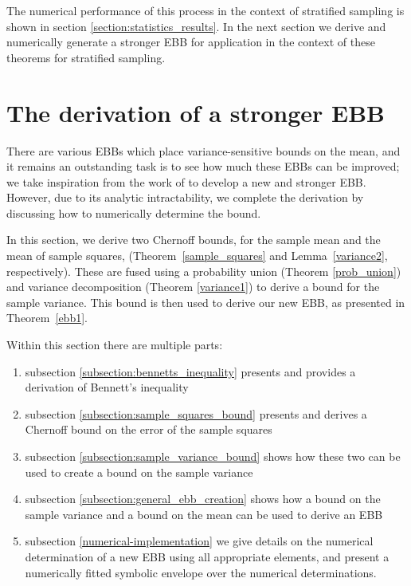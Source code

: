 The numerical performance of this process in the context of stratified sampling is shown in section \ref{section:statistics_results}.
In the next section we derive and numerically generate a stronger EBB for application in the context of these theorems for stratified sampling.








\newpage
\section{The derivation of a stronger EBB}\label{section:new_EBB}\label{derivation}

There are various EBBs which place variance-sensitive bounds on the mean, and it remains an outstanding task is to see how much these EBBs can be improved; we take inspiration from the work of \cite{Maurer50empiricalbernstein} to develop a new and stronger EBB.
However, due to its analytic intractability, we complete the derivation by discussing how to numerically determine the bound.


In this section, we derive two Chernoff bounds, for the sample mean and the mean of sample squares, (Theorem~\ref{sample_squares} and Lemma~\ref{variance2}, respectively). 
These are fused using a probability union (Theorem \ref{prob_union}) and variance decomposition (Theorem \ref{variance1}) to derive a bound for the sample variance. This bound is then used to derive our new EBB, as presented in Theorem~\ref{ebb1}.

Within this section there are multiple parts:
\begin{enumerate}
\item	subsection \ref{subsection:bennetts_inequality} presents and provides a derivation of Bennett's inequality
\item	subsection \ref{subsection:sample_squares_bound} presents and derives a Chernoff bound on the error of the sample squares
\item	subsection \ref{subsection:sample_variance_bound} shows how these two can be used to create a bound on the sample variance
\item	subsection \ref{subsection:general_ebb_creation} shows how a bound on the sample variance and a bound on the mean can be used to derive an EBB
\item	subsection \ref{numerical-implementation} we give details on the numerical determination of a new EBB using all appropriate elements, and present a numerically fitted symbolic envelope over the numerical determinations. 
\end{enumerate}


